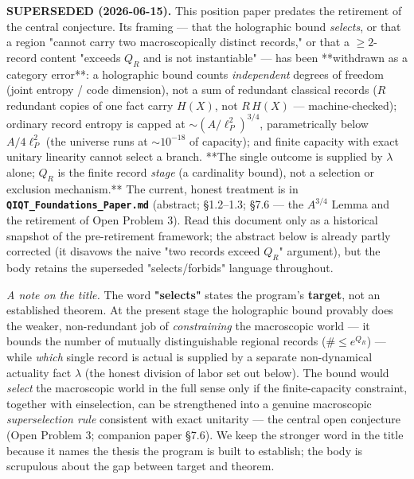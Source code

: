 \documentclass[11pt,a4paper]{article}
\newenvironment{qiqtquote}{\begin{mdframed}[style=quotestyle]}{\end{mdframed}}
\begin{document}
\begin{abstract}
\end{abstract}

\tableofcontents
\newpage

\begin{qiqtquote}
\textbf{SUPERSEDED (2026-06-15).} This position paper predates the retirement of the central conjecture. Its
framing — that the holographic bound \emph{selects}, or that a region "cannot carry two macroscopically distinct
records," or that a $\ge 2$-record content "exceeds $Q_R$ and is not instantiable" — has been **withdrawn as
a category error**: a holographic bound counts \emph{independent} degrees of freedom (joint entropy / code
dimension), not a sum of redundant classical records ($R$ redundant copies of one fact carry $H(X)$, not
$R\,H(X)$ — machine-checked); ordinary record entropy is capped at $\sim (A/\ell_P^2)^{3/4}$, parametrically
below $A/4\ell_P^2$ (the universe runs at $\sim 10^{-18}$ of capacity); and finite capacity with exact
unitary linearity cannot select a branch. **The single outcome is supplied by $\lambda$ alone; $Q_R$ is the
finite record \emph{stage} (a cardinality bound), not a selection or exclusion mechanism.** The current, honest
treatment is in \textbf{\texttt{QIQT\_Foundations\_Paper.md}} (abstract; §1.2–1.3; §7.6 — the $A^{3/4}$ Lemma and the
retirement of Open Problem 3). Read this document only as a historical snapshot of the pre-retirement
framework; the abstract below is already partly corrected (it disavows the naive "two records exceed $Q_R$"
argument), but the body retains the superseded "selects/forbids" language throughout.
\end{qiqtquote}

\emph{A note on the title.} The word \textbf{"selects"} states the program's \textbf{target}, not an established theorem. At the present stage the holographic bound provably does the weaker, non-redundant job of \emph{constraining} the macroscopic world — it bounds the number of mutually distinguishable regional records ($\# \le e^{Q_R}$) — while \emph{which} single record is actual is supplied by a separate non-dynamical actuality fact $\lambda$ (the honest division of labor set out below). The bound would \emph{select} the macroscopic world in the full sense only if the finite-capacity constraint, together with einselection, can be strengthened into a genuine macroscopic \emph{superselection rule} consistent with exact unitarity — the central open conjecture (Open Problem 3; companion paper §7.6). We keep the stronger word in the title because it names the thesis the program is built to establish; the body is scrupulous about the gap between target and theorem.
\end{document}
